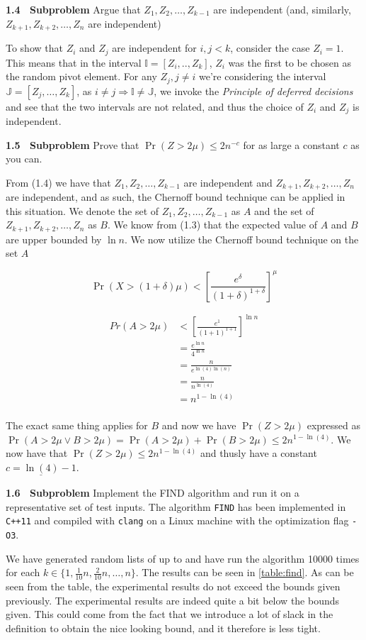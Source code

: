 \documentclass[article,a4paper,oneside]{article}
\newcommand{\+}[1]{\ensuremath{\boldsymbol{#1}}}
\begin{document}
{\bf 1.4 \ Subproblem} Argue that $Z_1,Z_2,\ldots,Z_{k-1}$ are independent 
(and, similarly, $Z_{k+1},Z_{k+2},\ldots,Z_n$  are independent)

To show that $Z_i$ and $Z_j$ are independent for $i,j < k$, consider the case $Z_i = 1$. This means that in the interval $\mathbb{I} = [Z_i,..,Z_k]$, $Z_i$ was the first to be chosen as the random pivot element.
For any $Z_j, j \neq i$ we're considering the interval $\mathbb{J} = [Z_j,\ldots, Z_k]$, as $i \neq j \Rightarrow \mathbb{I} \neq \mathbb{J}$, we invoke the \emph{Principle of deferred decisions} and see that the two intervals are not related, and thus the choice of $Z_i$ and $Z_j$ is independent.

{\bf 1.5 \ Subproblem}
Prove that $\Pr(Z>2\mu)\leq 2 n^{-c}$ for as
large a constant $c$ as you can.

From (1.4) we have that $Z_1, Z_2, \ldots, Z_{k-1}$ are independent and $Z_{k+1}, Z_{k+2}, \ldots, Z_n$ are independent, and as such, the Chernoff bound technique can be applied in this situation. We denote the set of $Z_1, Z_2, \ldots, Z_{k-1}$ as $A$ and the set of $Z_{k+1}, Z_{k+2}, \ldots, Z_n$ as $B$. We know from (1.3) that the expected value of $A$ and $B$ are upper bounded by $\ln n$. We now utilize the Chernoff bound technique on the set $A$

$$\Pr \left( X > (1+\delta)\mu \right) < \left[ \frac{e^\delta}{(1+\delta)^{1+\delta}} \right]^\mu$$

\begin{align*}
  Pr( A > 2\mu) & <  \left[ \frac{e^1}{(1+1)^{1+1}} \right] ^{\ln n} \\
  &= \frac{e^{\ln n}}{4^{\ln n}}\\ 
  &= \frac {n}{e^{\ln(4)\ln(n)}} \\
  &= \frac{n}{n^{\ln(4)}}\\
  &= n^{1-\ln (4)}\\
\end{align*}

The exact same thing applies for $B$ and now we have $\Pr ( Z > 2\mu)$ expressed as $ \Pr ( A > 2\mu \vee B > 2\mu) = \Pr ( A > 2\mu) + \Pr( B > 2\mu) \leq 2n^{1-\ln(4)}$. We now have that $\Pr ( Z > 2\mu) \leq 2n^{1-\ln(4)}$ and thusly have a constant $\underline{c=\ln(4)-1}$.

{\bf 1.6 \ Subproblem} Implement the FIND algorithm and run it on a
representative set of test inputs. 
The algorithm \texttt{FIND} has been implemented in \texttt{C++11} and compiled with \texttt{clang} on a Linux machine with the optimization flag \texttt{-O3}.
\par
We have generated random lists of up to  and have run the algorithm 10000 times  for each $k \in \lbrace 1, \frac{1}{10}n, \frac{2}{10}n, \ldots, n\rbrace$. The results can be seen in \ref{table:find}.
As can be seen from the table, the experimental results do not exceed the bounds given previously. The experimental results are indeed quite a bit below the bounds given. This could come from the fact that we introduce a lot of slack in the definition to obtain the nice looking bound, and it therefore is less tight.
\end{document}
